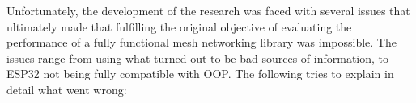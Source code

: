 Unfortunately, the development of the research was faced with several issues that ultimately made that fulfilling the original objective of evaluating the performance of a fully functional mesh networking library was impossible. The issues range from using what turned out to be bad sources of information, to ESP32 not being fully compatible with OOP. The following tries to explain in detail what went wrong:
